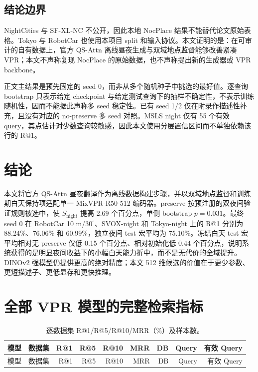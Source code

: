 \documentclass[UTF8,a4paper,11pt]{ctexart}
\begin{document}
\subsection{结论边界}
NightCities 与 SF-XL-NC 不公开，因此本地 NocPlace 结果不能替代论文原始表格。Tokyo 与 RobotCar 也使用本项目 split 和输入协议。本文证明的是：在可审计的自有数据上，官方 QS-Attn 离线昼夜生成与双域地点监督能够改善紧凑 VPR；本文不声称复现 NocPlace 的原始数据，也不声称提出新的生成器或 VPR backbone。

正文主结果是预先固定的 seed 0，而非从多个随机种子中挑选的最好值。逐查询 bootstrap 只表示给定 checkpoint 与给定测试查询下的抽样不确定性，不表示训练随机性，因而不能据此声称多 seed 稳定性。已有 seed 1/2 仅在附录作描述性补充，且没有对应的 no-preserve 多 seed 对照。MSLS night 仅有 55 个有效 query，其点估计对少数查询较敏感，因此本文使用分层置信区间而不单独依赖该行的 R@1。

\section{结论}
本文将官方 QS-Attn 昼夜翻译作为离线数据构建步骤，并以双域地点监督和训练期白天保持项适配单一 MixVPR-R50-512 编码器。preserve 按预注册的双夜间验证规则被选中，使 $S_{\mathrm{night}}$ 提高 2.69 个百分点，单侧 bootstrap $p=0.031$。最终 seed 0 在 RobotCar 10 m/$30^\circ$、SVOX-night 和 Tokyo-night 上的 R@1 分别为 88.24\%、76.06\% 和 60.99\%，独立夜间 test 宏平均为 75.10\%。冻结白天 test 宏平均相对无 preserve 仅低 0.15 个百分点、相对初始化低 0.44 个百分点，说明系统获得的是明显夜间收益下的小幅白天能力折中，而不是无代价的全域提升。DINOv2 强模型仍提供更高的绝对精度；本文 512 维候选的价值在于更少参数、更短描述子、更低显存和更快推理。

\appendix
\section{全部 VPR 模型的完整检索指标}
\begingroup
\scriptsize
\setlength{\tabcolsep}{3pt}
\begin{longtable}{llrrrrrrr}
\caption{逐数据集 R@1/R@5/R@10/MRR（\%）及样本数。}\label{tab:appendix-metrics}\\
\toprule
模型 & 数据集 & R@1 & R@5 & R@10 & MRR & DB & Query & 有效 Query\\
\midrule
\endfirsthead
\toprule
模型 & 数据集 & R@1 & R@5 & R@10 & MRR & DB & Query & 有效 Query\\
\midrule
\endhead

\end{longtable}
\endgroup
\end{document}

